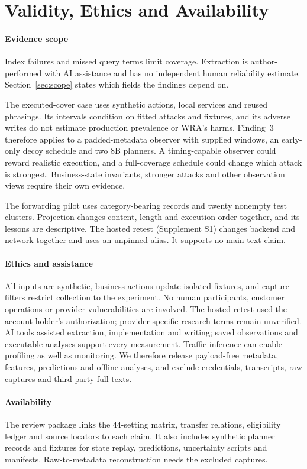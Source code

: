 \section{Validity, Ethics and Availability}\label{sec:validity}
\paragraph{Evidence scope}
Index failures and missed query terms limit coverage. Extraction is author-performed with AI assistance and has no independent human reliability estimate. Section~\ref{sec:scope} states which fields the findings depend on.

The executed-cover case uses synthetic actions, local services and reused phrasings. Its intervals condition on fitted attacks and fixtures, and its adverse writes do not estimate production prevalence or WRA's harms. Finding~3 therefore applies to a padded-metadata observer with supplied windows, an early-only decoy schedule and two 8B planners. A timing-capable observer could reward realistic execution, and a full-coverage schedule could change which attack is strongest. Business-state invariants, stronger attacks and other observation views require their own evidence.

The forwarding pilot uses category-bearing records and twenty nonempty test clusters. Projection changes content, length and execution order together, and its lessons are descriptive. The hosted retest (Supplement S1) changes backend and network together and uses an unpinned alias. It supports no main-text claim.

\paragraph{Ethics and assistance}
All inputs are synthetic, business actions update isolated fixtures, and capture filters restrict collection to the experiment. No human participants, customer operations or provider vulnerabilities are involved. The hosted retest used the account holder's authorization; provider-specific research terms remain unverified. AI tools assisted extraction, implementation and writing; saved observations and executable analyses support every measurement. Traffic inference can enable profiling as well as monitoring. We therefore release payload-free metadata, features, predictions and offline analyses, and exclude credentials, transcripts, raw captures and third-party full texts.

\paragraph{Availability}
The review package links the 44-setting matrix, transfer relations, eligibility ledger and source locators to each claim. It also includes synthetic planner records and fixtures for state replay, predictions, uncertainty scripts and manifests. Raw-to-metadata reconstruction needs the excluded captures.

